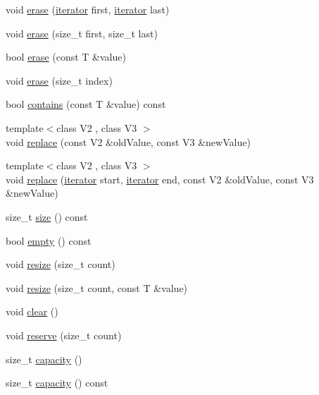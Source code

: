\begin{DoxyCompactItemize}
\item 
void \hyperlink{classfm_1_1vector_aecc4c831ec1f4e7fd2994a5ba5857831}{erase} (\hyperlink{classfm_1_1vector_a45a46984d2c34a4b3a21a8f8532fa213}{iterator} first, \hyperlink{classfm_1_1vector_a45a46984d2c34a4b3a21a8f8532fa213}{iterator} last)
\item 
void \hyperlink{classfm_1_1vector_ada1ca033fdfe7d2e92bbf319bba0671a}{erase} (size\_\-t first, size\_\-t last)
\item 
bool \hyperlink{classfm_1_1vector_aa04c5659c77a2fa5ba7621cf4bb235e4}{erase} (const T \&value)
\item 
void \hyperlink{classfm_1_1vector_a468b390df204f9ffa871dabd9511bd8a}{erase} (size\_\-t index)
\item 
bool \hyperlink{classfm_1_1vector_a3e17b3c9fdd401988711bed2bec7de71}{contains} (const T \&value) const 
\item 
{\footnotesize template$<$class V2 , class V3 $>$ }\\void \hyperlink{classfm_1_1vector_a064bc4ba5b6c2bd39c16c39d9bbfddd8}{replace} (const V2 \&oldValue, const V3 \&newValue)
\item 
{\footnotesize template$<$class V2 , class V3 $>$ }\\void \hyperlink{classfm_1_1vector_a24bb2099c35447e403af18b15fff6827}{replace} (\hyperlink{classfm_1_1vector_a45a46984d2c34a4b3a21a8f8532fa213}{iterator} start, \hyperlink{classfm_1_1vector_a45a46984d2c34a4b3a21a8f8532fa213}{iterator} end, const V2 \&oldValue, const V3 \&newValue)
\item 
size\_\-t \hyperlink{classfm_1_1vector_ade5232e5e4af6f14b6b6db490182a867}{size} () const 
\item 
bool \hyperlink{classfm_1_1vector_a74ef295eac3b2308a9e76cdabc61064c}{empty} () const 
\item 
void \hyperlink{classfm_1_1vector_ad2ab68ff780ada857f06a0b190a324a5}{resize} (size\_\-t count)
\item 
void \hyperlink{classfm_1_1vector_a325e9c6128f96ad3fd7d935effc1aff1}{resize} (size\_\-t count, const T \&value)
\item 
void \hyperlink{classfm_1_1vector_a975b229085aa01bb58f4ece2143199bf}{clear} ()
\item 
void \hyperlink{classfm_1_1vector_a760c90ff63c9bf14cfe36370510c0317}{reserve} (size\_\-t count)
\item 
size\_\-t \hyperlink{classfm_1_1vector_a4f28974be0880c59e4634cdcdbfcf1e3}{capacity} ()
\item 
size\_\-t \hyperlink{classfm_1_1vector_a005a7f4cbb1ccfb413b9455f5ba94951}{capacity} () const 

\end{DoxyCompactItemize}
